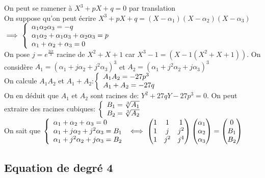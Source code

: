 \documentclass[]{report}
\begin{document}
    \begin{center}
        On peut se ramener à $X^3+pX+q=0$ par translation\\
        On suppose qu'on peut écrire $X^3+pX+q=(X-\alpha_1)(X-\alpha_2)(X-\alpha_3)$\\
        $\implies\left\{\begin{array}{ll} \alpha_1\alpha_2\alpha_3=-q\\\alpha_1\alpha_2+\alpha_1\alpha_3+\alpha_2\alpha_3=p \\\alpha_1+\alpha_2+\alpha_3=0 \end{array} \right.$\\
        On pose $j=e^{\frac{2i\pi}{3}}$ racine de $X^2+X+1$ car $X^3-1=(X-1(X^2+X+1))$. On considère $A_1={(\alpha_1+j\alpha_2+j^2\alpha_3)}^3$ et $A_2={(\alpha_1+j^2\alpha_2+j\alpha_3)}^3$\\
        On calcule $A_1 A_2$ et $A_1+A_2$:$\left\{\begin{array}{ll} A_1A_2=-27p^3\\ A_1+A_2=-27q \end{array} \right.$\\
        On en déduit que $A_1$ et $A_2$ sont racines de: $Y^2+27qY-27p^3=0$. On peut extraire des racines cubiques: $\left\{\begin{array}{ll} B_1=\sqrt[3]{A_1}\\B_2=\sqrt[3]{A_2} \end{array} \right.$\\
        On sait que $\left\{\begin{array}{ll} \alpha_1+\alpha_2+\alpha_3=0\\\alpha_1+j\alpha_2+j^2\alpha_3=B_1 \\\alpha_1+j^2\alpha_2+j\alpha_3=B_2 \end{array} \right.\iff \left(\begin{matrix}
        1&1&1\\
        1&j&j^2\\
        1&j^2&j^4            
        \end{matrix}\right)\left(\begin{matrix}
            \alpha_1\\
            \alpha_2\\
            \alpha_3
        \end{matrix}\right)=\left(\begin{matrix}
            0\\
            B_1\\
            B_2
        \end{matrix}\right)$
    \end{center}

    \subsection*{Equation de degré 4}
\end{document}
